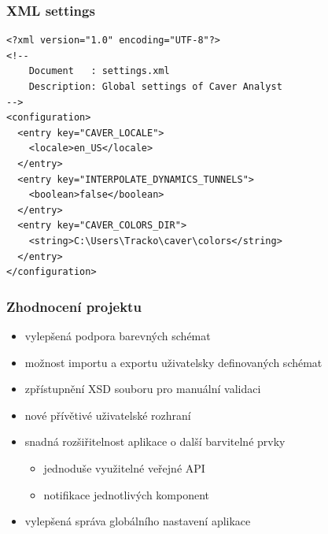 \documentclass[slovak]{beamer}
\begin{document}
\begin{frame}[fragile]
	\frametitle{XML settings}
	\lstset{language=XML}
	\scriptsize{
	\begin{lstlisting}
<?xml version="1.0" encoding="UTF-8"?>
<!--
    Document   : settings.xml
    Description: Global settings of Caver Analyst
-->
<configuration>
  <entry key="CAVER_LOCALE">
    <locale>en_US</locale>
  </entry>
  <entry key="INTERPOLATE_DYNAMICS_TUNNELS">
    <boolean>false</boolean>
  </entry>
  <entry key="CAVER_COLORS_DIR">
    <string>C:\Users\Tracko\caver\colors</string>
  </entry>
</configuration>
	\end{lstlisting}}
\end{frame}

\begin{frame}
\frametitle{Zhodnocení projektu}
	\begin{itemize}
		\item vylepšená podpora barevných schémat
		\item možnost importu a exportu uživatelsky definovaných schémat
		\item zpřístupnění XSD souboru pro manuální validaci
		\item nové přívětivé uživatelské rozhraní
		\item snadná rozšiřitelnost aplikace o další barvitelné prvky
		\begin{itemize}
			\item jednoduše využitelné veřejné API
			\item notifikace jednotlivých komponent
		\end{itemize}
		\item vylepšená správa globálního nastavení aplikace 
	\end{itemize}
\end{frame}
\end{document}
